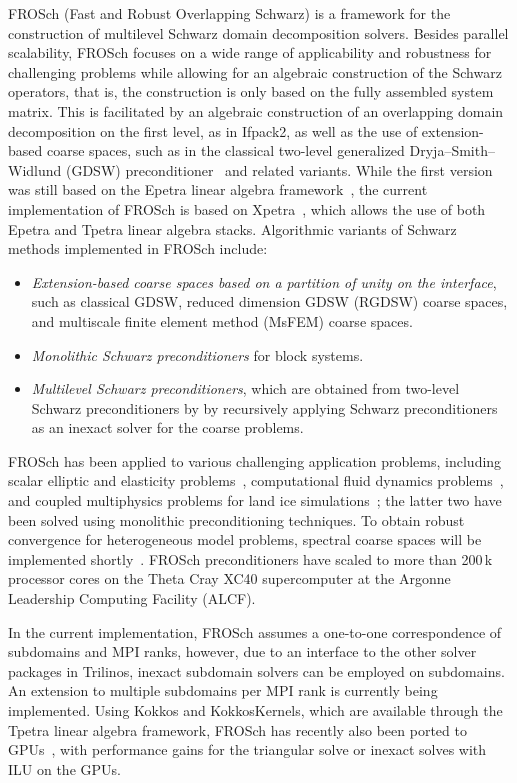 FROSch (Fast and Robust Overlapping Schwarz) is a framework for the construction of multilevel Schwarz domain decomposition solvers. Besides parallel scalability, FROSch focuses on a wide range of applicability and robustness for challenging problems while allowing for an algebraic construction of the Schwarz operators, that is, the construction is only based on the fully assembled system matrix. This is facilitated by an algebraic construction of an overlapping domain decomposition on the first level, as in Ifpack2, as well as the use of extension-based coarse spaces, such as in the classical two-level generalized Dryja--Smith--Widlund (GDSW) preconditioner~\cite{dohrmann_domain_2008} and related variants. While the first version was still based on the Epetra linear algebra framework~\cite{heinlein_parallel_2016}, the current implementation of FROSch is based on Xpetra~\cite{heinlein_frosch_2020}, which allows the use of both Epetra and Tpetra linear algebra stacks. Algorithmic variants of Schwarz methods implemented in FROSch include:
\begin{itemize}
	\item \emph{Extension-based coarse spaces based on a partition of unity on the interface}, such as classical GDSW, reduced dimension GDSW (RGDSW) coarse spaces, and multiscale finite element method (MsFEM) coarse spaces.
	\item \emph{Monolithic Schwarz preconditioners} for block systems.
	\item \emph{Multilevel Schwarz preconditioners}, which are obtained from two-level Schwarz preconditioners by by recursively applying Schwarz preconditioners as an inexact solver for the coarse problems.
\end{itemize}
FROSch has been applied to various challenging application problems, including scalar elliptic and elasticity problems~\cite{heinlein_parallel_2016}, computational fluid dynamics problems~\cite{heinlein_monolithic_2019}, and coupled multiphysics problems for land ice simulations~\cite{heinlein_frosch_2022}; the latter two have been solved using monolithic preconditioning techniques. To obtain robust convergence for heterogeneous model problems, spectral coarse spaces will be implemented shortly~\cite{heinlein_adaptive_2019}. FROSch preconditioners have scaled to more than 200\,k processor cores on the Theta Cray XC40 supercomputer at the Argonne Leadership Computing Facility (ALCF).

In the current implementation, FROSch assumes a one-to-one correspondence of subdomains and MPI ranks, however, due to an interface to the other solver packages in Trilinos, inexact subdomain solvers can be employed on subdomains. An extension to multiple subdomains per MPI rank is currently being implemented. Using Kokkos and KokkosKernels, which are available through the Tpetra linear algebra framework, FROSch has recently also been ported to GPUs~\cite{Yamazaki:2022:EST}, with performance gains for the triangular solve or inexact solves with ILU on the GPUs.

